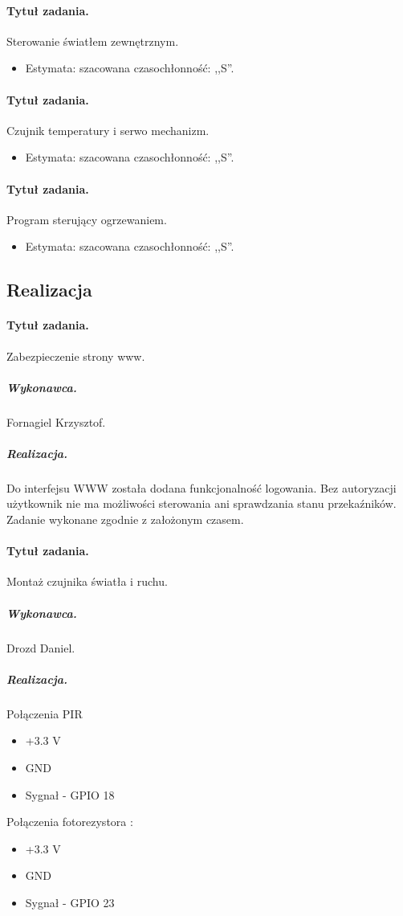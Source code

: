 \paragraph{Tytuł zadania.} Sterowanie światłem zewnętrznym.
\begin{itemize}
	\item Estymata: szacowana czasochłonność: ,,S''.
\end{itemize}

\paragraph{Tytuł zadania.} Czujnik temperatury i serwo mechanizm.
\begin{itemize}
	\item Estymata: szacowana czasochłonność: ,,S''.
\end{itemize}

\paragraph{Tytuł zadania.} Program sterujący ogrzewaniem.
\begin{itemize}
	\item Estymata: szacowana czasochłonność: ,,S''.
\end{itemize}


\subsection{Realizacja}

\paragraph{Tytuł zadania.} Zabezpieczenie strony www.
\subparagraph{Wykonawca.} Fornagiel Krzysztof.
\subparagraph{Realizacja.} Do interfejsu WWW została dodana funkcjonalność logowania. Bez autoryzacji użytkownik nie ma możliwości sterowania ani sprawdzania stanu przekaźników. Zadanie wykonane zgodnie z założonym czasem.

\paragraph{Tytuł zadania.} Montaż czujnika światła i ruchu.
\subparagraph{Wykonawca.} Drozd Daniel.
\subparagraph{Realizacja.} 	Połączenia PIR 

\begin{itemize}
	\item +3.3 V
	\item GND
	\item Sygnał - GPIO 18
\end{itemize}
Połączenia fotorezystora :
\begin{itemize}
	\item +3.3 V
	\item GND
	\item Sygnał - GPIO 23
\end{itemize}

